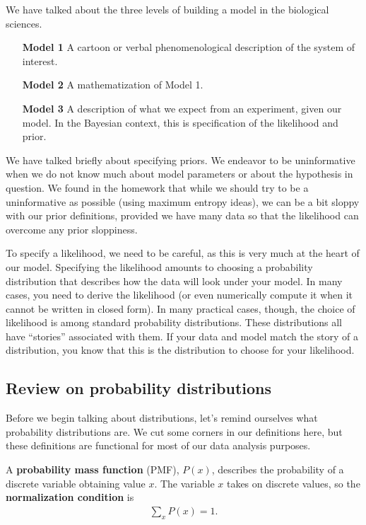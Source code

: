 We have talked about the three levels of building a model in the
biological sciences.
\begin{itemize}
\item[\textbf{Model 1}] A cartoon or verbal phenomenological
  description of the system of interest.
\item[\textbf{Model 2}] A mathematization of Model 1.
\item[\textbf{Model 3}] A description of what we expect from an
  experiment, given our model.  In the Bayesian context, this is
  specification of the likelihood and prior.
\end{itemize}

We have talked briefly about specifying priors.  We endeavor to
be uninformative when we do not know much about model parameters or
about the hypothesis in question.  We found in the homework that while
we should try to be a uninformative as possible (using maximum entropy
ideas), we can be a bit sloppy with our prior definitions, provided we
have many data so that the likelihood can overcome any prior
sloppiness.

To specify a likelihood, we need to be careful, as this is very much
at the heart of our model.  Specifying the likelihood amounts to
choosing a probability distribution that describes how the data will
look under your model.  In many cases, you need to derive the
likelihood (or even numerically compute it when it cannot be written
in closed form).  In many practical cases, though, the choice of
likelihood is among standard probability distributions.  These
distributions all have ``stories'' associated with them.  If your data
and model match the story of a distribution, you know that this is the
distribution to choose for your likelihood.

\subsection{Review on probability distributions}
Before we begin talking about distributions, let's remind ourselves
what probability distributions are.  We cut some corners in our
definitions here, but these definitions are functional for most of our
data analysis purposes.

A \textbf{probability mass function} (PMF), $P(x)$, describes the
probability of a discrete variable obtaining value $x$.  The variable
$x$ takes on discrete values, so the \textbf{normalization condition}
is
\begin{align}
\sum_x P(x) = 1.
\end{align}

